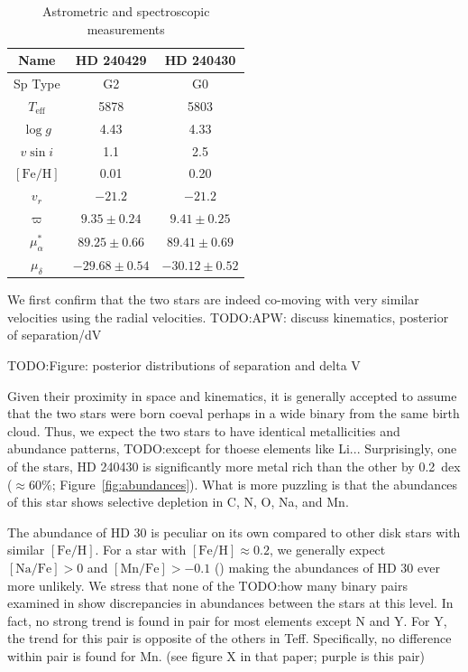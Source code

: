\documentclass[manuscript]{aastex6}
\newcommand*\elem[1]{\ensuremath{\mathrm{#1}}}
\newcommand{\todo}[1]{{\color{blue}TODO:#1}}
\begin{document}
\begin{table}[htpb]
  \centering
  \caption{Astrometric and spectroscopic measurements}
  \label{tab:t2}
  \begin{tabular}{ccc}
\hline\hline
Name & HD 240429 & HD 240430 \\
\hline
Sp Type & G2 & G0 \\
$T_\mathrm{eff}$ & 5878 & 5803 \\
$\log{g}$ & 4.43 & 4.33 \\
$v\sin{i}$ & 1.1 & 2.5 \\
$[\elem{Fe}/\elem{H}]$ & 0.01 & 0.20 \\
$v_r$ & $-21.2$ & $-21.2$ \\
$\varpi$ & $9.35 \pm 0.24$ & $9.41 \pm 0.25$ \\
$\mu_\alpha^*$ & $89.25 \pm 0.66$ & $89.41 \pm 0.69$ \\
$\mu_\delta$  & $-29.68 \pm 0.54$ & $-30.12 \pm 0.52$\\
\hline\hline
\end{tabular}
\end{table}

We first confirm that the two stars are indeed co-moving with very similar
velocities using the radial velocities.
\todo{APW: discuss kinematics, posterior of separation/dV}

\todo{Figure: posterior distributions of separation and delta V}

Given their proximity in space and kinematics,
it is generally accepted to assume that the two stars were born coeval
perhaps in a wide binary from the same birth cloud.
Thus, we expect the two stars to have identical metallicities and abundance patterns,
\todo{except for thoese elements like Li...}
Surprisingly, one of the stars, HD 240430 is significantly more metal
rich than the other by 0.2~dex ($\approx 60\%$; Figure~\ref{fig:abundances}).
What is more puzzling is that the abundances of this star
shows selective depletion in C, N, O, Na, and Mn.

The abundance of HD 30 is peculiar on its own compared to other disk stars with
similar $[\elem{Fe}/\elem{H}]$.
For a star with $[\elem{Fe}/\elem{H}] \approx 0.2$, we generally expect
$[\elem{Na}/\elem{Fe}] > 0$ and $[\elem{Mn}/\elem{Fe}] > -0.1$
(\citealt{Battistini:2015aa,Bensby:2003aa}) making the abundances of HD 30 ever more unlikely.
We stress that none of the \todo{how many} binary pairs examined in \citealt{2016ApJS..225...32B}
show discrepancies in abundances between the stars at this level.
In fact, no strong trend is found in pair for most elements
except N and Y.
For Y, the trend for this pair is opposite of the others in Teff.
Specifically, no difference within pair is found for Mn.
(see figure X in that paper; purple is this pair)
\end{document}
